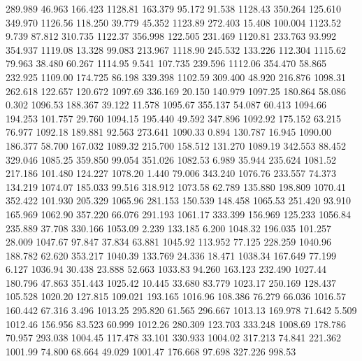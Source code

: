  289.989   46.963  166.423      1128.81
 163.379   95.172   91.538      1128.43
 350.264  125.610  349.970      1126.56
 118.250   39.779   45.352      1123.89
 272.403   15.408  100.004      1123.52
   9.739   87.812  310.735      1122.37
 356.998  122.505  231.469      1120.81
 233.763   93.992  354.937      1119.08
  13.328   99.083  213.967      1118.90
 245.532  133.226  112.304      1115.62
  79.963   38.480   60.267      1114.95
   9.541  107.735  239.596      1112.06
 354.470   58.865  232.925      1109.00
 174.725   86.198  339.398      1102.59
 309.400   48.920  216.876      1098.31
 262.618  122.657  120.672      1097.69
 336.169   20.150  140.979      1097.25
 180.864   58.086    0.302      1096.53
 188.367   39.122   11.578      1095.67
 355.137   54.087   60.413      1094.66
 194.253  101.757   29.760      1094.15
 195.440   49.592  347.896      1092.92
 175.152   63.215   76.977      1092.18
 189.881   92.563  273.641      1090.33
   0.894  130.787   16.945      1090.00
 186.377   58.700  167.032      1089.32
 215.700  158.512  131.270      1089.19
 342.553   88.452  329.046      1085.25
 359.850   99.054  351.026      1082.53
   6.989   35.944  235.624      1081.52
 217.186  101.480  124.227      1078.20
   1.440   79.006  343.240      1076.76
 233.557   74.373  134.219      1074.07
 185.033   99.516  318.912      1073.58
  62.789  135.880  198.809      1070.41
 352.422  101.930  205.329      1065.96
 281.153  150.539  148.458      1065.53
 251.420   93.910  165.969      1062.90
 357.220   66.076  291.193      1061.17
 333.399  156.969  125.233      1056.84
 235.889   37.708  330.166      1053.09
   2.239  133.185    6.200      1048.32
 196.035  101.257   28.009      1047.67
  97.847   37.834   63.881      1045.92
 113.952   77.125  228.259      1040.96
 188.782   62.620  353.217      1040.39
 133.769   24.336   18.471      1038.34
 167.649   77.199    6.127      1036.94
  30.438   23.888   52.663      1033.83
  94.260  163.123  232.490      1027.44
 180.796   47.863  351.443      1025.42
  10.445   33.680   83.779      1023.17
 250.169  128.437  105.528      1020.20
 127.815  109.021  193.165      1016.96
 108.386   76.279   66.036      1016.57
 160.442   67.316    3.496      1013.25
 295.820   61.565  296.667      1013.13
 169.978   71.642    5.509      1012.46
 156.956   83.523   60.999      1012.26
 280.309  123.703  333.248      1008.69
 178.786   70.957  293.038      1004.45
 117.478   33.101  330.933      1004.02
 317.213   74.841  221.362      1001.99
  74.800   68.664   49.029      1001.47
 176.668   97.698  327.226       998.53

